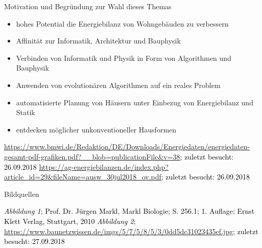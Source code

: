 \documentclass[11pt]{beamer}
\begin{document}
\begin{frame}{Motivation und Begründung zur Wahl dieses Themas}
\begin{itemize}
\pause
\item{hohes Potential die Energiebilanz von Wohngebäuden zu verbessern}\pause
\item{Affinität zur Informatik, Architektur und Bauphysik}\pause
\item{Verbinden von Informatik und Physik in Form von Algorithmen und Bauphysik}\pause
\item{Anwenden von evolutionären Algorithmen auf ein reales Problem}\pause
\item{automatisierte Planung von Häusern unter Einbezug von Energiebilanz und Statik}\pause
\item{entdecken möglicher unkonventioneller Hausformen}
\end{itemize}
\end{frame}
\begin{frame}
\begin{thebibliography}{9}
\textcolor{black}{\url{https://www.bmwi.de/Redaktion/DE/Downloads/Energiedaten/energiedaten-gesamt-pdf-grafiken.pdf?__blob=publicationFile&v=38}; zuletzt besucht: 26.09.2018}
\textcolor{black}{
\url{https://ag-energiebilanzen.de/index.php?article_id=29&fileName=ausw_30jul2018_ov.pdf}; zuletzt besucht: 26.09.2018}
\end{thebibliography}
\end{frame}
\begin{frame}{Bildquellen}
\begin{thebibliography}{9}
\textcolor{black}{
\textit{Abbildung 1}; Prof. Dr. Jürgen Markl, Markl Biologie; S. 256.1; 1. Auflage; Ernst Klett Verlag, Stuttgart, 2010}
\textcolor{black}{
\textit{Abbildung 2}; \url{https://www.baunetzwissen.de/imgs/5/7/5/8/5/3/0dd5dc31023435ef.jpg}; zuletzt besucht: 27.09.2018}
\end{thebibliography}
\end{frame}
\end{document}
